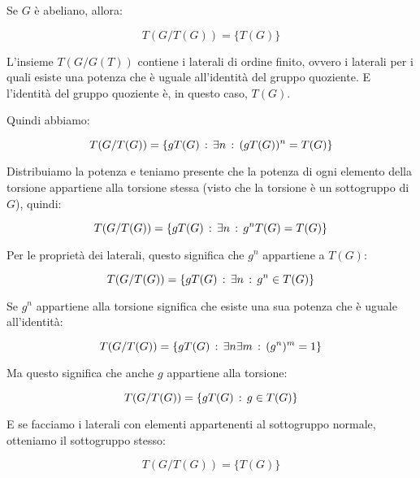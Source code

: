 \begin{esercizio}
	\label{ex:torsione_del_quoziente}
	Se $G$ è abeliano, allora:
	
	\begin{equation}
		T(G/T(G)) = \{T(G)\}
	\end{equation}
\end{esercizio}
\begin{soluzione}
	L'insieme $T(G/G(T))$ contiene i laterali di ordine finito, ovvero i laterali per i quali esiste una potenza che è uguale all'identità del gruppo quoziente. E l'identità del gruppo quoziente è, in questo caso, $T(G)$.
	
	Quindi abbiamo:
	
	\begin{equation}
		T(G/T(G)) = \{gT(G) \,:\, \exists n \,:\, (gT(G))^n = T(G)\}
	\end{equation}
	
	Distribuiamo la potenza e teniamo presente che la potenza di ogni elemento della torsione appartiene alla torsione stessa (visto che la torsione è un sottogruppo di $G$), quindi:
	
	\begin{equation}
		T(G/T(G)) = \{gT(G) \,:\, \exists n \,:\, g^nT(G) = T(G)\}
	\end{equation}

	Per le proprietà dei laterali, questo significa che $g^n$ appartiene a $T(G)$:
	
	\begin{equation}
		T(G/T(G)) = \{gT(G) \,:\, \exists n \,:\, g^n \in T(G)\}
	\end{equation}

	Se $g^n$ appartiene alla torsione significa che esiste una sua potenza che è uguale all'identità:
	
	\begin{equation}
		T(G/T(G)) = \{gT(G) \,:\, \exists n \exists m \,:\, (g^n)^m = 1\}
	\end{equation}

	Ma questo significa che anche $g$ appartiene alla torsione:
	
	\begin{equation}
		T(G/T(G)) = \{gT(G) \,:\, g \in T(G)\}
	\end{equation}

	E se facciamo i laterali con elementi appartenenti al sottogruppo normale, otteniamo il sottogruppo stesso:
	
	\begin{equation}
		T(G/T(G)) = \{T(G)\}
	\end{equation}
\end{soluzione}

